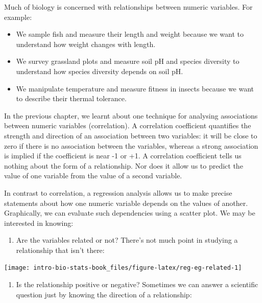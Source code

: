 \documentclass[
]{book}
\providecommand{\tightlist}{%
  \setlength{\itemsep}{0pt}\setlength{\parskip}{0pt}}
\begin{document}
Much of biology is concerned with relationships between numeric variables. For example:

\begin{itemize}
\tightlist
\item
  We sample fish and measure their length and weight because we want to understand how weight changes with length.
\item
  We survey grassland plots and measure soil pH and species diversity to understand how species diversity depends on soil pH.
\item
  We manipulate temperature and measure fitness in insects because we want to describe their thermal tolerance.
\end{itemize}

In the previous chapter, we learnt about one technique for analysing associations between numeric variables (correlation). A correlation coefficient quantifies the strength and direction of an association between two variables: it will be close to zero if there is no association between the variables, whereas a strong association is implied if the coefficient is near -1 or +1. A correlation coefficient tells us nothing about the form of a relationship. Nor does it allow us to predict the value of one variable from the value of a second variable.

In contrast to correlation, a regression analysis allows us to make precise statements about how one numeric variable depends on the values of another. Graphically, we can evaluate such dependencies using a scatter plot. We may be interested in knowing:

\begin{enumerate}
\def\labelenumi{\arabic{enumi}.}
\tightlist
\item
  Are the variables related or not? There's not much point in studying a relationship that isn't there:
\end{enumerate}

\begin{center}\texttt{[image: intro-bio-stats-book\_files/figure-latex/reg-eg-related-1]} \end{center}

\begin{enumerate}
\def\labelenumi{\arabic{enumi}.}
\setcounter{enumi}{1}
\tightlist
\item
  Is the relationship positive or negative? Sometimes we can answer a scientific question just by knowing the direction of a relationship:
\end{enumerate}
\end{document}
